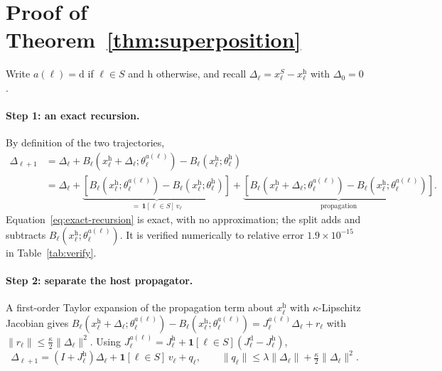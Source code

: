 \documentclass[10pt]{article}
\theoremstyle{plain}
\theoremstyle{definition}
\theoremstyle{remark}
\newcommand{\host}{\mathrm{h}}
\newcommand{\donor}{\mathrm{d}}
\begin{document}



\newpage
\appendix

\section{Proof of Theorem~\ref{thm:superposition}}
\label{app:proof-superposition}

Write $a(\ell)=\donor$ if $\ell\in S$ and $\host$ otherwise, and recall
$\Delta_\ell = x^{S}_\ell - x^{\host}_\ell$ with $\Delta_0=0$.

\paragraph{Step 1: an exact recursion.}
By definition of the two trajectories,
\begin{align}
\Delta_{\ell+1}
&= \Delta_\ell + B_\ell\!\left(x^{\host}_\ell+\Delta_\ell;\theta^{a(\ell)}_\ell\right) - B_\ell\!\left(x^{\host}_\ell;\theta^{\host}_\ell\right) \nonumber\\
&= \Delta_\ell
+ \underbrace{\left[B_\ell\!\left(x^{\host}_\ell;\theta^{a(\ell)}_\ell\right) - B_\ell\!\left(x^{\host}_\ell;\theta^{\host}_\ell\right)\right]}_{=\,\mathbf{1}[\ell\in S]\, v_\ell}
+ \underbrace{\left[B_\ell\!\left(x^{\host}_\ell+\Delta_\ell;\theta^{a(\ell)}_\ell\right) - B_\ell\!\left(x^{\host}_\ell;\theta^{a(\ell)}_\ell\right)\right]}_{\text{propagation}} .
\label{eq:exact-recursion}
\end{align}
Equation~\eqref{eq:exact-recursion} is exact, with no approximation; the split
adds and subtracts $B_\ell(x^{\host}_\ell;\theta^{a(\ell)}_\ell)$. It is verified
numerically to relative error $1.9\times10^{-15}$ in Table~\ref{tab:verify}.

\paragraph{Step 2: separate the host propagator.}
A first-order Taylor expansion of the propagation term about $x^{\host}_\ell$
with $\kappa$-Lipschitz Jacobian gives
$B_\ell(x^{\host}_\ell+\Delta_\ell;\theta^{a(\ell)}_\ell) - B_\ell(x^{\host}_\ell;\theta^{a(\ell)}_\ell) = J^{a(\ell)}_\ell \Delta_\ell + r_\ell$
with $\|r_\ell\| \le \tfrac{\kappa}{2}\|\Delta_\ell\|^2$. Using
$J^{a(\ell)}_\ell = J^{\host}_\ell + \mathbf{1}[\ell\in S](J^{\donor}_\ell - J^{\host}_\ell)$,
\begin{equation}
\label{eq:host-recursion}
\Delta_{\ell+1} = \left(I + J^{\host}_\ell\right)\Delta_\ell + \mathbf{1}[\ell\in S]\, v_\ell + q_\ell,
\qquad
\|q_\ell\| \le \lambda\|\Delta_\ell\| + \tfrac{\kappa}{2}\|\Delta_\ell\|^2 .
\end{equation}
\end{document}
